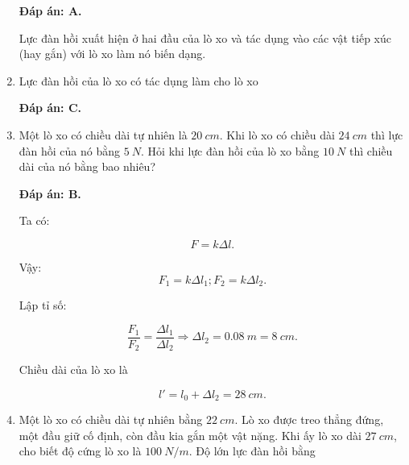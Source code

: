 \begin{enumerate}[label=\bfseries Câu \arabic*:]
	\hideall
	{	
		\textbf{Đáp án: A.}
		
		Lực đàn hồi xuất hiện ở hai đầu của lò xo và tác dụng vào các vật tiếp xúc (hay gắn) với lò xo làm nó biến dạng.
	}
	\item {}
	
	
	{
		Lực đàn hồi của lò xo có tác dụng làm cho lò xo
	}
	
	\hideall
	{	
		\textbf{Đáp án: C.}
	}
	\item {}
	
	
	{
		Một lò xo có chiều dài tự nhiên là $\SI{20}{cm}$. Khi lò xo có chiều dài $\SI{24}{cm}$ thì lực đàn hồi của nó bằng $\SI{5}{N}$. Hỏi khi lực đàn hồi của lò xo bằng $\SI{10}{N}$ thì chiều dài của nó bằng bao nhiêu?
	}
	
	\hideall
	{	
		\textbf{Đáp án: B.}
		
		Ta có:
		
		$$F = k \Delta l.$$
		
		Vậy: 
		$$F_1 = k \Delta l_1; F_2 = k \Delta l_2.$$
		
		Lập tỉ số:
		
		$$\dfrac{F_1}{F_2} = \dfrac{\Delta l_1}{\Delta l_2} \Rightarrow \Delta l_2 = \SI{0,08}{m} = \SI{8}{cm}.$$
		
		Chiều dài của lò xo là
		
		$$l' = l_0 + \Delta l_2 = \SI{28}{cm}.$$
	}
	\item {}
	
	
	{
		Một lò xo có chiều dài tự nhiên bằng $\SI{22}{cm}$. Lò xo được treo thẳng đứng, một đầu giữ cố định, còn đầu kia gắn một vật nặng. Khi ấy lò xo dài $\SI{27}{cm}$, cho biết độ cứng lò xo là $\SI{100}{N/m}$. Độ lớn lực đàn hồi bằng 
	}
	

\end{enumerate}

